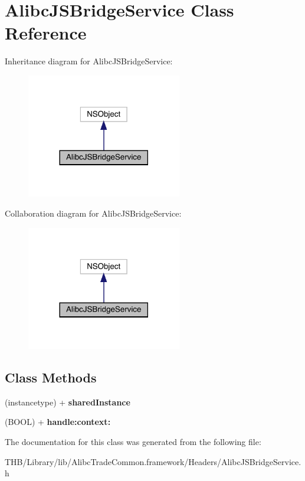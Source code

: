 \hypertarget{interface_alibc_j_s_bridge_service}{}\section{Alibc\+J\+S\+Bridge\+Service Class Reference}
\label{interface_alibc_j_s_bridge_service}


Inheritance diagram for Alibc\+J\+S\+Bridge\+Service\+:\nopagebreak
\begin{figure}[H]
\begin{center}
\leavevmode
\includegraphics[width=192pt]{interface_alibc_j_s_bridge_service__inherit__graph}
\end{center}
\end{figure}


Collaboration diagram for Alibc\+J\+S\+Bridge\+Service\+:\nopagebreak
\begin{figure}[H]
\begin{center}
\leavevmode
\includegraphics[width=192pt]{interface_alibc_j_s_bridge_service__coll__graph}
\end{center}
\end{figure}
\subsection*{Class Methods}
\begin{DoxyCompactItemize}
\item 
\mbox{\label{interface_alibc_j_s_bridge_service_a6b260bc851e1928c81dab7e0fe53ef78}} 
(instancetype) + {\bfseries shared\+Instance}
\item 
\mbox{\label{interface_alibc_j_s_bridge_service_aa8f49e12ad11eade34c5cef0e858f26e}} 
(B\+O\+OL) + {\bfseries handle\+:context\+:}
\end{DoxyCompactItemize}


The documentation for this class was generated from the following file\+:\begin{DoxyCompactItemize}
\item 
T\+H\+B/\+Library/lib/\+Alibc\+Trade\+Common.\+framework/\+Headers/Alibc\+J\+S\+Bridge\+Service.\+h\end{DoxyCompactItemize}
